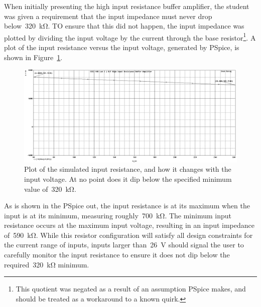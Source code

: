 When initially presenting the high input resistance buffer amplifier, the
student was given a requirement that the input impedance must never drop
below~\SI{320}{\kilo\ohm}.  TO ensure that this did not happen, the input
impedance was plotted by dividing the input voltage by the current through the
base resistor\footnote{This quotient was negated as a result of an assumption
PSpice makes, and should be treated as a workaround to a known quirk.}.  A plot
of the input resistance versus the input voltage, generated by PSpice, is shown
in Figure~\ref{fig:bjtPlotR}.
%
\begin{figure}[H]
	\centering
	\includegraphics[width=\pwidth]{img/plot/bjtPlotR.PNG}
	\parbox{\pwidth}{
	\caption[PSpice Plot --- Buffer Amplifier (Resistance)]{Plot of the
		simulated input resistance, and how it changes with the input voltage.
		At no point does it dip below the specified minimum value
		of~\SI{320}{\kilo\ohm}.}
	\label{fig:bjtPlotR}}
\end{figure}
%
As is shown in the PSpice out, the input resistance is at its maximum when the
input is at its minimum, measuring roughly~\SI{700}{\kilo\ohm}.  The minimum
input resistance occurs at the maximum input voltage, resulting in an input
impedance of~\SI{590}{\kilo\ohm}.  While this resistor configuration will
satisfy all design constraints for the current range of inputs, inputs larger
than~\SI{26}{\volt} should signal the user to carefully monitor the input
resistance to ensure it does not dip below the required~\SI{320}{\kilo\ohm}
minimum.
